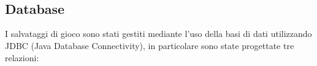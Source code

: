 \documentclass[italian,12pt,a4paper]{article}
\begin{document}
	
	\begin{figure}
		\centering
		\\
		\\
		\label{fig:immagini}
	\end{figure}
	
	\subsection{Database}
	
	I salvataggi di gioco sono stati gestiti mediante l'uso della basi di dati utilizzando JDBC (Java Database Connectivity), in particolare sono state progettate tre relazioni:
	
\end{document}
